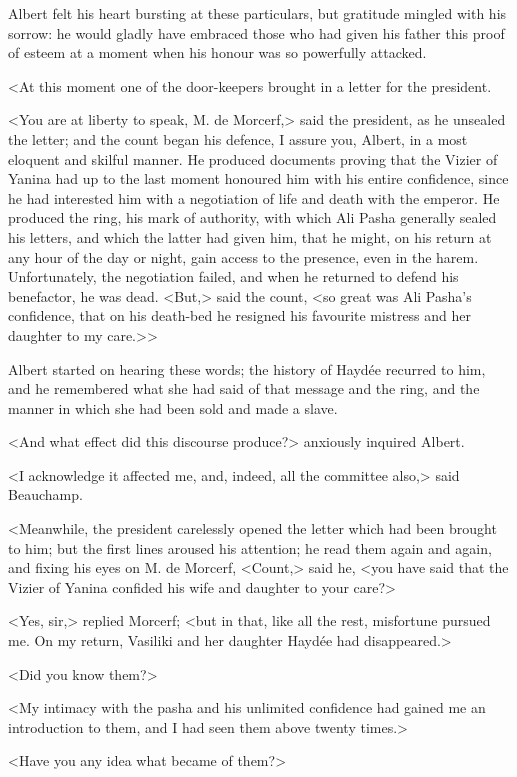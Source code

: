  Albert felt his heart bursting at these particulars, but gratitude mingled with his sorrow: he would gladly have embraced those who had given his father this proof of esteem at a moment when his honour was so powerfully attacked. 

<At this moment one of the door-keepers brought in a letter for the president. 
 
 <You are at liberty to speak, M. de Morcerf,> said the president, as he unsealed the letter; and the count began his defence, I assure you, Albert, in a most eloquent and skilful manner. He produced documents proving that the Vizier of Yanina had up to the last moment honoured him with his entire confidence, since he had interested him with a negotiation of life and death with the emperor. He produced the ring, his mark of authority, with which Ali Pasha generally sealed his letters, and which the latter had given him, that he might, on his return at any hour of the day or night, gain access to the presence, even in the harem. Unfortunately, the negotiation failed, and when he returned to defend his benefactor, he was dead. <But,> said the count, <so great was Ali Pasha's confidence, that on his death-bed he resigned his favourite mistress and her daughter to my care.>>

 Albert started on hearing these words; the history of Haydée recurred to him, and he remembered what she had said of that message and the ring, and the manner in which she had been sold and made a slave. 

 <And what effect did this discourse produce?> anxiously inquired Albert. 

 <I acknowledge it affected me, and, indeed, all the committee also,> said Beauchamp. 

<Meanwhile, the president carelessly opened the letter which had been brought to him; but the first lines aroused his attention; he read them again and again, and fixing his eyes on M. de Morcerf, <Count,> said he, <you have said that the Vizier of Yanina confided his wife and daughter to your care?>

<Yes, sir,> replied Morcerf; <but in that, like all the rest, misfortune pursued me. On my return, Vasiliki and her daughter Haydée had disappeared.>

<Did you know them?>

<My intimacy with the pasha and his unlimited confidence had gained me an introduction to them, and I had seen them above twenty times.> 

<Have you any idea what became of them?>

